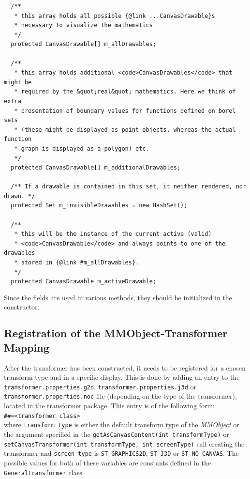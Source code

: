 \documentclass[a4paper,12pt]{book}
\newcommand{\mmo}{\emph{MMObject }}
\begin{document}
\begin{footnotesize}
\begin{verbatim}
  /**
   * this array holds all possible {@link ...CanvasDrawable}s
   * necessary to visualize the mathematics
   */
  protected CanvasDrawable[] m_allDrawables;

  /**
   * this array holds additional <code>CanvasDrawables</code> that might be
   * required by the &quot;real&quot; mathematics. Here we think of extra
   * presentation of boundary values for functions defined on borel sets
   * (these might be displayed as point objects, whereas the actual function
   * graph is displayed as a polygon) etc.
   */
  protected CanvasDrawable[] m_additionalDrawables;

  /** If a drawable is contained in this set, it neither rendered, nor drawn. */
  protected Set m_invisibleDrawables = new HashSet();

  /**
   * this will be the instance of the current active (valid)
   * <code>CanvasDrawable</code> and always points to one of the drawables
   * stored in {@link #m_allDrawables}.
   */
  protected CanvasDrawable m_activeDrawable;
\end{verbatim}
\end{footnotesize}
Since the fields are used in various methods, they should be initialized in the constructor.

\subsection{Registration of the MMObject-Transformer Mapping}
After the transformer has been constructed, it needs to be registered for a chosen transform type and in a specific display.
This is done by adding an entry to the {\tt transformer.properties.g2d}, {\tt transformer.properties.j3d} or  
{\tt transformer.properties.noc} file (depending on the type of the transformer), located in the transformer package. This 
entry is of the following form:\\
{\footnotesize\tt <transform type>\#<screen type>\#<mmobject class>=<transformer class>}\\ 
where {\tt transform type} is either the default transform type of the \mmo or the argument specified in the 
{\tt getAsCanvasContent(int transformType)} or {\tt setCanvasTransformer(int transformType, int screenType)} call creating the 
transformer and {\tt screen type} is {\tt ST\_GRAPHICS2D}, {\tt ST\_J3D} or {\tt ST\_NO\_CANVAS}. The possible values for
both of these variables are constants defined in the {\tt GeneralTransformer} class.
  
\end{document}
